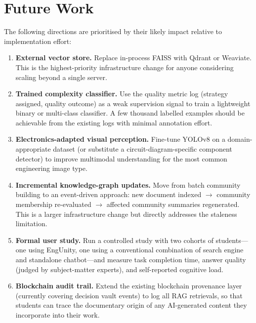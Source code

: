 \section{Future Work}
\label{sec:future-conclusions}

The following directions are prioritised by their likely impact relative to
implementation effort:

\begin{enumerate}
    \item \textbf{External vector store.} Replace in-process FAISS with
    Qdrant or Weaviate. This is the highest-priority infrastructure change
    for anyone considering scaling beyond a single server.

    \item \textbf{Trained complexity classifier.} Use the quality metric log
    (strategy assigned, quality outcome) as a weak supervision signal to train
    a lightweight binary or multi-class classifier. A few thousand labelled
    examples should be achievable from the existing logs with minimal annotation
    effort.

    \item \textbf{Electronics-adapted visual perception.} Fine-tune YOLOv8
    on a domain-appropriate dataset (or substitute a circuit-diagram-specific
    component detector) to improve multimodal understanding for the most common
    engineering image type.

    \item \textbf{Incremental knowledge-graph updates.} Move from batch
    community building to an event-driven approach: new document indexed $\to$
    community membership re-evaluated $\to$ affected community summaries
    regenerated. This is a larger infrastructure change but directly addresses
    the staleness limitation.

    \item \textbf{Formal user study.} Run a controlled study with two cohorts
    of students---one using EngUnity, one using a conventional combination of
    search engine and standalone chatbot---and measure task completion time,
    answer quality (judged by subject-matter experts), and self-reported
    cognitive load.

    \item \textbf{Blockchain audit trail.} Extend the existing blockchain
    provenance layer (currently covering decision vault events) to log all
    RAG retrievals, so that students can trace the documentary origin of any
    AI-generated content they incorporate into their work.
\end{enumerate}

